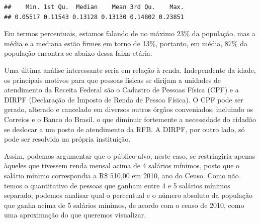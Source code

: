 \documentclass[]{article}
\newenvironment{Shaded}{\begin{snugshade}}{\end{snugshade}}
\newcommand{\KeywordTok}[1]{\textcolor[rgb]{0.13,0.29,0.53}{\textbf{#1}}}
\newcommand{\NormalTok}[1]{#1}
\newcommand{\OperatorTok}[1]{\textcolor[rgb]{0.81,0.36,0.00}{\textbf{#1}}}
\begin{document}
\begin{Shaded}
\end{Shaded}

\begin{verbatim}
##    Min. 1st Qu.  Median    Mean 3rd Qu.    Max. 
## 0.05517 0.11543 0.13128 0.13130 0.14802 0.23851
\end{verbatim}

Em termos percentuais, estamos falando de no máximo 23\% da população,
mas a média e a mediana estão firmes em torno de 13\%, portanto, em
média, 87\% da população encontra-se abaixo dessa faixa etária.

Uma última análise interessante seria em relação à renda. Independente
da idade, os principais motivos para que pessoas físicas se dirijam a
unidades de atendimento da Receita Federal são o Cadastro de Pessoas
Física (CPF) e a DIRPF (Declaração de Imposto de Renda de Pessoa
Física). O CPF pode ser gerado, alterado e cancelado em diversos outros
órgãos conveniados, incluindo os Correios e o Banco do Brasil. o que
diminuir fortemente a necessidade do cidadão se deslocar a um posto de
atendimento da RFB. A DIRPF, por outro lado, só pode ser resolvida na
própria instituição.

Assim, podemos argumentar que o público-alvo, neste caso, se
restringiria apenas àqueles que tivessem renda mensal acima de 4
salários mínimos, posto que o salário mínimo correspondia a R\$ 510,00
em 2010, ano do Censo. Como não temos o quantitativo de pessoas que
ganham entre 4 e 5 salários mínimos separado, podemos analisar qual o
percentual e o número absoluto da população que ganha acima de 5
salários mínimos, de acordo com o censo de 2010, como uma aproximação do
que queremos visualizar.
\end{document}
